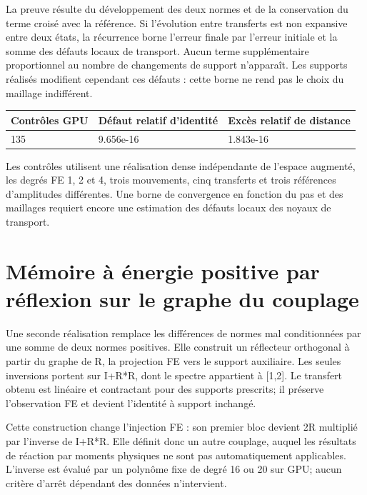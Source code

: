 \documentclass[10pt,a4paper]{article}
\begin{document}
La preuve résulte du développement des deux normes et de la conservation du terme croisé avec la référence. Si l'évolution entre transferts est non expansive entre deux états, la récurrence borne l'erreur finale par l'erreur initiale et la somme des défauts locaux de transport. Aucun terme supplémentaire proportionnel au nombre de changements de support n'apparaît. Les supports réalisés modifient cependant ces défauts : cette borne ne rend pas le choix du maillage indifférent.

\begin{center}\small\begin{tabular}{lll}\toprule
Contrôles GPU & Défaut relatif d'identité & Excès relatif de distance\\\midrule
135 & 9.656e-16 & 1.843e-16\\
\bottomrule\end{tabular}\end{center}
Les contrôles utilisent une réalisation dense indépendante de l'espace augmenté, les degrés FE 1, 2 et 4, trois mouvements, cinq transferts et trois références d'amplitudes différentes. Une borne de convergence en fonction du pas et des maillages requiert encore une estimation des défauts locaux des noyaux de transport.

\section{Mémoire à énergie positive par réflexion sur le graphe du couplage}
Une seconde réalisation remplace les différences de normes mal conditionnées par une somme de deux normes positives. Elle construit un réflecteur orthogonal à partir du graphe de R, la projection FE vers le support auxiliaire. Les seules inversions portent sur I+R*R, dont le spectre appartient à [1,2]. Le transfert obtenu est linéaire et contractant pour des supports prescrits; il préserve l'observation FE et devient l'identité à support inchangé.

Cette construction change l'injection FE : son premier bloc devient 2R multiplié par l'inverse de I+R*R. Elle définit donc un autre couplage, auquel les résultats de réaction par moments physiques ne sont pas automatiquement applicables. L'inverse est évalué par un polynôme fixe de degré 16 ou 20 sur GPU; aucun critère d'arrêt dépendant des données n'intervient.
\end{document}
